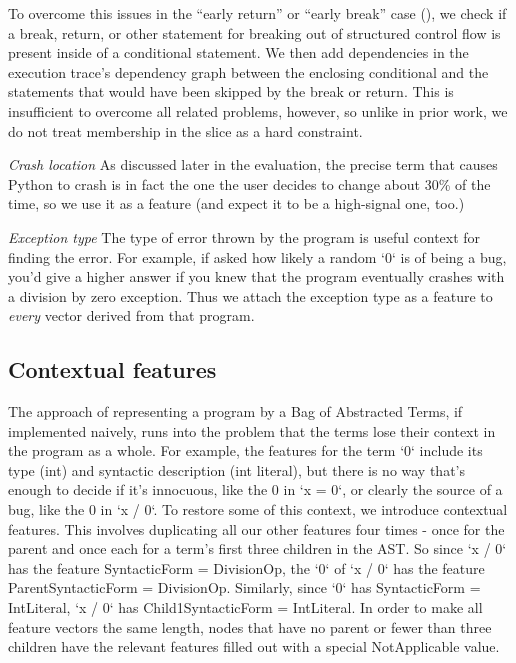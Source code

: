 \documentclass[conference]{IEEEtran}
\begin{document}
To overcome this issues in the ``early return'' or ``early break'' case
(), we check if a break, return, or other statement for
breaking out of structured control flow is present inside of a conditional
statement. We then add dependencies in the execution trace's dependency graph
between the enclosing conditional and the statements that would have been skipped
by the break or return. This is insufficient to overcome all related problems,
however, so unlike in prior work, we do not treat membership in the slice
as a hard constraint.

\emph{Crash location} As discussed later in the evaluation, the precise term that
causes Python to crash is in fact the one the user decides to change about 30\% of
the time, so we use it as a feature (and expect it to be a high-signal one, too.)

\emph{Exception type} The type of error thrown by the program is useful context for
finding the error. For example, if asked how likely a random `0` is of being a bug, you'd give
a higher answer if you knew that the program eventually crashes with a division by
zero exception. Thus we attach the exception type as a feature to \emph{every}
vector derived from that program.

\subsection{Contextual features}

The approach of representing a program by a Bag of Abstracted Terms, if implemented
naively, runs into the problem that the terms lose their context in the program
as a whole. For example, the features for the term `0` include its type (int) and
syntactic description (int literal), but there is no way that's enough to decide
if it's innocuous, like the 0 in `x = 0`, or clearly the source of a bug, like the
0 in `x / 0`. To restore some of this context, we introduce contextual features.
This involves duplicating all our other features four times - once for the parent
and once each for a term's first three children in the AST. So since `x / 0` has
the feature SyntacticForm = DivisionOp, the `0` of `x / 0` has the feature
ParentSyntacticForm = DivisionOp. Similarly, since `0` has SyntacticForm = IntLiteral,
`x / 0` has Child1SyntacticForm = IntLiteral. In order to make all feature vectors
the same length, nodes that have no parent or fewer than three children have the
relevant features filled out with a special NotApplicable value.
\end{document}
